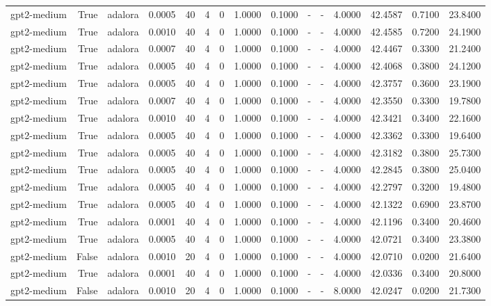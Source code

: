 \begin{tabular}{lrlrrrrrrlllrrr}
gpt2-medium & True & adalora & 0.0005 & 40 & 4 & 0 & 1.0000 & 0.1000 & - & - & 4.0000 & 42.4587 & 0.7100 & 23.8400 \\
gpt2-medium & True & adalora & 0.0010 & 40 & 4 & 0 & 1.0000 & 0.1000 & - & - & 4.0000 & 42.4585 & 0.7200 & 24.1900 \\
gpt2-medium & True & adalora & 0.0007 & 40 & 4 & 0 & 1.0000 & 0.1000 & - & - & 4.0000 & 42.4467 & 0.3300 & 21.2400 \\
gpt2-medium & True & adalora & 0.0005 & 40 & 4 & 0 & 1.0000 & 0.1000 & - & - & 4.0000 & 42.4068 & 0.3800 & 24.1200 \\
gpt2-medium & True & adalora & 0.0005 & 40 & 4 & 0 & 1.0000 & 0.1000 & - & - & 4.0000 & 42.3757 & 0.3600 & 23.1900 \\
gpt2-medium & True & adalora & 0.0007 & 40 & 4 & 0 & 1.0000 & 0.1000 & - & - & 4.0000 & 42.3550 & 0.3300 & 19.7800 \\
gpt2-medium & True & adalora & 0.0010 & 40 & 4 & 0 & 1.0000 & 0.1000 & - & - & 4.0000 & 42.3421 & 0.3400 & 22.1600 \\
gpt2-medium & True & adalora & 0.0005 & 40 & 4 & 0 & 1.0000 & 0.1000 & - & - & 4.0000 & 42.3362 & 0.3300 & 19.6400 \\
gpt2-medium & True & adalora & 0.0005 & 40 & 4 & 0 & 1.0000 & 0.1000 & - & - & 4.0000 & 42.3182 & 0.3800 & 25.7300 \\
gpt2-medium & True & adalora & 0.0005 & 40 & 4 & 0 & 1.0000 & 0.1000 & - & - & 4.0000 & 42.2845 & 0.3800 & 25.0400 \\
gpt2-medium & True & adalora & 0.0005 & 40 & 4 & 0 & 1.0000 & 0.1000 & - & - & 4.0000 & 42.2797 & 0.3200 & 19.4800 \\
gpt2-medium & True & adalora & 0.0005 & 40 & 4 & 0 & 1.0000 & 0.1000 & - & - & 4.0000 & 42.1322 & 0.6900 & 23.8700 \\
gpt2-medium & True & adalora & 0.0001 & 40 & 4 & 0 & 1.0000 & 0.1000 & - & - & 4.0000 & 42.1196 & 0.3400 & 20.4600 \\
gpt2-medium & True & adalora & 0.0005 & 40 & 4 & 0 & 1.0000 & 0.1000 & - & - & 4.0000 & 42.0721 & 0.3400 & 23.3800 \\
gpt2-medium & False & adalora & 0.0010 & 20 & 4 & 0 & 1.0000 & 0.1000 & - & - & 4.0000 & 42.0710 & 0.0200 & 21.6400 \\
gpt2-medium & True & adalora & 0.0001 & 40 & 4 & 0 & 1.0000 & 0.1000 & - & - & 4.0000 & 42.0336 & 0.3400 & 20.8000 \\
gpt2-medium & False & adalora & 0.0010 & 20 & 4 & 0 & 1.0000 & 0.1000 & - & - & 8.0000 & 42.0247 & 0.0200 & 21.7300 \\

\end{tabular}
